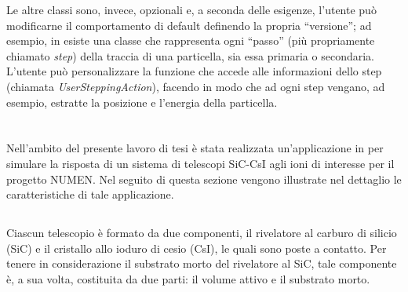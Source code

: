 Le altre classi sono, invece, opzionali e, a seconda delle esigenze, l'utente può modificarne il comportamento di default definendo la propria ``versione''; 
%
ad esempio, in \geant{} esiste una classe che rappresenta ogni ``passo'' (più propriamente chiamato \emph{step}) della traccia di una particella, sia essa primaria o secondaria.
L'utente può personalizzare la funzione che accede alle informazioni dello step (chiamata \emph{UserSteppingAction}), facendo in modo che ad ogni step vengano, ad esempio, estratte la posizione e l'energia della particella.


\section{}

Nell'ambito del presente lavoro di tesi è stata realizzata un'applicazione in \geant{} per simulare la risposta di un sistema di telescopi SiC-CsI agli ioni di interesse per il progetto NUMEN.
Nel seguito di questa sezione vengono illustrate nel dettaglio le caratteristiche di tale applicazione.




\subsection{} \label{par:geometria}

Ciascun telescopio è formato da due componenti, il rivelatore al carburo di silicio (SiC) e il cristallo allo ioduro di cesio (CsI), le quali sono poste a contatto.
Per tenere in considerazione il substrato morto del rivelatore al SiC, tale componente è, a sua volta, costituita da due parti: il volume attivo e il substrato morto.

